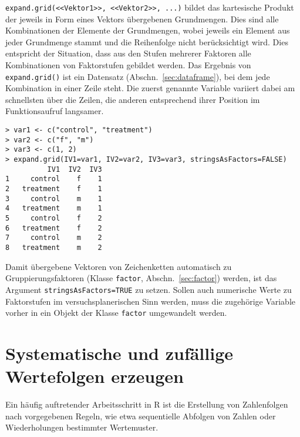 \lstinline!expand.grid(<<Vektor1>>, <<Vektor2>>, ...)! bildet das kartesische Produkt der jeweils in Form eines Vektors übergebenen Grundmengen. Dies sind alle Kombinationen der Elemente der Grundmengen, wobei jeweils ein Element aus jeder Grundmenge stammt und die Reihenfolge nicht berücksichtigt wird. Dies entspricht der Situation, dass aus den Stufen mehrerer Faktoren alle Kombinationen von Faktorstufen gebildet werden. Das Ergebnis von \lstinline!expand.grid()! ist ein Datensatz (Abschn.\ \ref{sec:dataframe}), bei dem jede Kombination in einer Zeile steht. Die zuerst genannte Variable variiert dabei am schnellsten über die Zeilen, die anderen entsprechend ihrer Position im Funktionsaufruf langsamer.
\begin{lstlisting}
> var1 <- c("control", "treatment")
> var2 <- c("f", "m")
> var3 <- c(1, 2)
> expand.grid(IV1=var1, IV2=var2, IV3=var3, stringsAsFactors=FALSE)
          IV1  IV2  IV3
1     control    f    1
2   treatment    f    1
3     control    m    1
4   treatment    m    1
5     control    f    2
6   treatment    f    2
7     control    m    2
8   treatment    m    2
\end{lstlisting}

Damit übergebene Vektoren von Zeichenketten automatisch zu Gruppierungsfaktoren (Klasse \lstinline!factor!, Abschn.\ \ref{sec:factor}) werden, ist das Argument \lstinline!stringsAsFactors=TRUE! zu setzen. Sollen auch numerische Werte zu Faktorstufen im versuchsplanerischen Sinn werden, muss die zugehörige Variable vorher in ein Objekt der Klasse \lstinline!factor! umgewandelt werden.

\section{Systematische und zufällige Wertefolgen erzeugen}
\label{sec:gen_sequence}

Ein häufig auftretender Arbeitsschritt in R ist die Erstellung von Zahlenfolgen nach vorgegebenen Regeln, wie etwa sequentielle Abfolgen von Zahlen oder Wiederholungen bestimmter Wertemuster.

